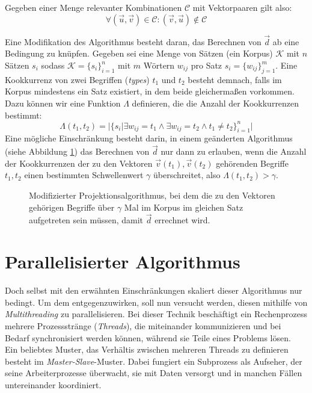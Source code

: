 Gegeben einer Menge relevanter Kombinationen $\mathcal{C}$ mit Vektorpaaren gilt also:
\begin{equation}
  \forall (\vec{u}, \vec{v}) \in \mathcal{C}: (\vec{v}, \vec{u}) \notin \mathcal{C}
\end{equation}

Eine Modifikation des Algorithmus besteht daran, das Berechnen von $\vec{d}$ ab eine Bedingung zu knüpfen.
Gegeben sei eine Menge von Sätzen (ein Korpus) $\mathcal{K}$ mit $n$ Sätzen $s_i$ sodass $\mathcal{K} = \{s_i\}_{i=1}^{n}$ mit
$m$ Wörtern $w_{ij}$ pro Satz $s_i = \{w_{ij}\}_{j=1}^m$. Eine Kookkurrenz von zwei Begriffen (\emph{types}) $t_1$ und $t_2$
besteht demnach, falls im Korpus mindestens ein Satz existiert, in dem beide gleichermaßen vorkommen. Dazu können wir
eine Funktion $\Lambda$ definieren, die die Anzahl der Kookkurrenzen bestimmt:
\begin{equation}
  \Lambda(t_1, t_2) = |\{s_i | \exists w_{ij} = t_1 \land \exists w_{ij} = t_2 \land t_1\neq t_2\}_{i=1}^{n}|
\end{equation}
Eine mögliche Einschränkung besteht darin, in einem geänderten Algorithmus (siehe Abbildung \ref{fig:algo2}) das Berechnen von $\vec{d}$ nur
dann zu erlauben, wenn die Anzahl der Kookkurrenzen der zu den Vektoren $\vec{v}(t_1), \vec{v}(t_2)$ gehörenden Begriffe $t_1, t_2$
einen bestimmten Schwellenwert $\gamma$ überschreitet, also $\Lambda(t_1, t_2) > \gamma$.

\begin{figure}[h]
  \centering
  \begin{algorithm}[H]
  \end{algorithm}
  \caption[Modifizierter Projektionsalgorithmus]{Modifizierter Projektionsalgorithmus, bei dem die zu den Vektoren gehörigen
  Begriffe über $\gamma$ Mal im Korpus im gleichen Satz aufgetreten sein müssen, damit $\vec{d}$ errechnet wird.\label{fig:algo2}}
\end{figure}


\section{Parallelisierter Algorithmus}\label{sec:para-algo}

Doch selbst mit den erwähnten Einschränkungen skaliert dieser Algorithmus nur bedingt. Um dem entgegenzuwirken, soll nun
versucht werden, diesen mithilfe von \emph{Multithreading} zu parallelisieren. Bei dieser Technik beschäftigt ein Rechenprozess
mehrere Prozessstränge (\emph{Threads}), die miteinander kommunizieren und bei Bedarf synchronisiert werden können,
während sie Teile eines Problems lösen.\\
Ein beliebtes Muster, das Verhältis zwischen mehreren Threads zu definieren besteht im \emph{Master-Slave}-Muster.
Dabei fungiert ein Subprozess als Aufseher, der seine Arbeiterprozesse überwacht, sie mit Daten versorgt und in manchen
Fällen untereinander koordiniert.\\ \\

